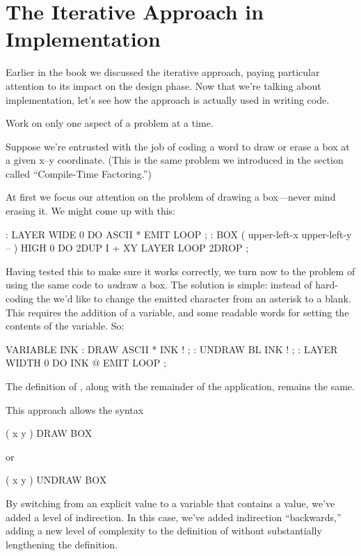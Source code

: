 \section{The Iterative Approach in Implementation}
Earlier in the book we discussed the iterative approach, paying
particular attention to its impact on the design phase. Now that we're
talking about implementation, let's see how the approach is actually
used in writing code.

\begin{tip}
Work on only one aspect of a problem at a time.
\end{tip}
Suppose we're entrusted with the job of coding a word to draw or erase
a box at a given x--y coordinate. (This is the same problem we
introduced in the section called ``Compile-Time Factoring.'')

At first we focus our attention on the problem of drawing a
box---never mind erasing it. We might come up with this:

\begin{Code}
: LAYER   WIDE  0 DO  ASCII * EMIT  LOOP ;
: BOX   ( upper-left-x  upper-left-y -- )
   HIGH  0 DO  2DUP  I +  XY LAYER  LOOP  2DROP ;
\end{Code}
Having tested this to make sure it works correctly, we turn now to the
problem of using the same code to \emph{un}draw a box. The solution is
simple: instead of hard-coding the  we'd like to change
the emitted character from an asterisk to a blank. This requires the
addition of a variable, and some readable words for setting the
contents of the variable. So:

\begin{Code}
VARIABLE INK
: DRAW   ASCII *  INK ! ;
: UNDRAW   BL  INK ! ;
: LAYER   WIDTH  0 DO  INK @  EMIT  LOOP ;
\end{Code}
The definition of , along with the remainder of the application,
remains the same.

This approach allows the syntax

\begin{Code}
( x y ) DRAW BOX
\end{Code}
or

\begin{Code}
( x y ) UNDRAW BOX
\end{Code}
By switching from an explicit value to a variable that contains a
value, we've added a level of indirection. In this case, we've added
indirection ``backwards,'' adding a new level of complexity to the
definition of  without substantially lengthening the definition.

